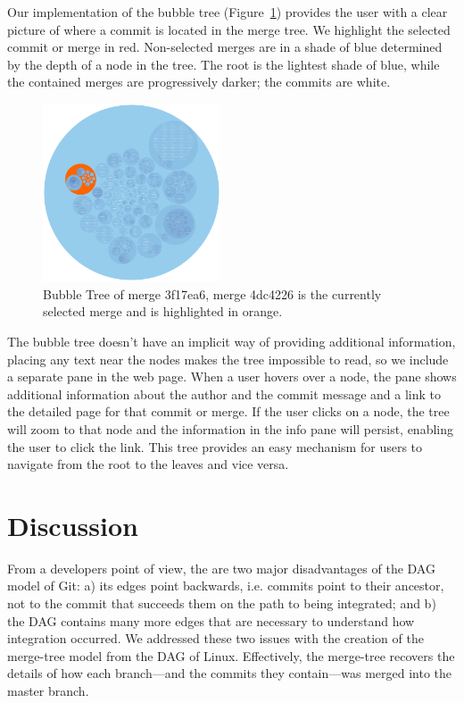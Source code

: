 \documentclass[draft]{IEEEtran}
\begin{document}
Our implementation of the bubble tree (Figure~\ref{fig:bubble_tree})
provides the user with a clear picture of where a commit is located in
the merge tree. We highlight the selected commit or merge in red.
Non-selected merges are in a shade of blue determined by the depth of a
node in the tree. The root is the lightest shade of blue, while the
contained merges are progressively darker; the commits are white.

\begin{figure}
        \centering
        \includegraphics[width=0.47\textwidth]{figures/bubble_tree.pdf}
        \caption{Bubble Tree of merge 3f17ea6, merge 4dc4226 is the currently
          selected merge and is highlighted in orange.}
        \label{fig:bubble_tree}
\end{figure}

The bubble tree doesn't have an implicit way of providing additional
information, placing any text near the nodes makes the tree impossible
to read, so we include a separate pane in the web page. When a user
hovers over a node, the pane shows additional information about the
author and the commit message and a link to the detailed page for that
commit or merge. If the user clicks on a node, the tree will zoom to
that node and the information in the info pane will persist, enabling
the user to click the link. This tree provides an easy mechanism for
users to navigate from the root to the leaves and vice versa.

\section{Discussion}

From a developers point of view, the are two major disadvantages of the
DAG model of Git: a) its edges point backwards, i.e. commits point to
their ancestor, not to the commit that succeeds them on the path to
being integrated; and b) the DAG contains many more edges that are
necessary to understand how integration occurred. We addressed these two
issues with the creation of the merge-tree model from the DAG of Linux.
Effectively, the merge-tree recovers the details of how each
branch---and the commits they contain---was merged into the master
branch.
\end{document}
